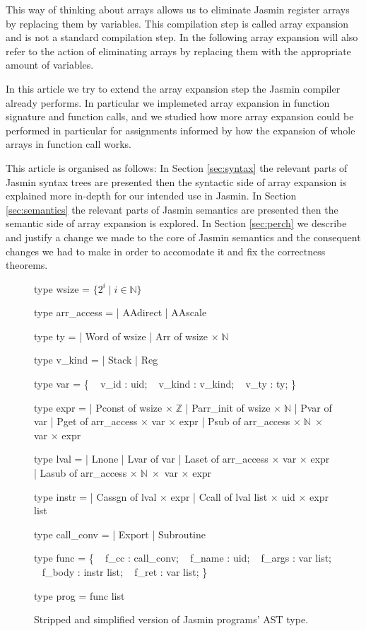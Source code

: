 \documentclass{article}
\newcommand\setZ{\mathbb{Z}}
\newcommand\setN{\mathbb{N}}
\begin{document}
This way of thinking about arrays allows us to eliminate Jasmin register arrays
by replacing them by variables. This compilation step is called array expansion
and is not a standard compilation step. In the following array expansion will
also refer to the action of eliminating arrays by replacing them with the
appropriate amount of variables.

\medskip

In this article we try to extend the array expansion step the Jasmin compiler
already performs. In particular we implemeted array expansion in function
signature and function calls, and we studied how more array expansion could be
performed in particular for assignments informed by how the expansion of whole
arrays in function call works.


\medskip

This article is organised as follows:
In Section \ref{sec:syntax} the relevant parts of Jasmin syntax trees are
presented then the syntactic side of array expansion is explained more in-depth
for our intended use in Jasmin.
In Section \ref{sec:semantics} the relevant parts of Jasmin semantics are
presented then the semantic side of array expansion is explored.
In Section \ref{sec:perch} we describe and justify a change we made to the core
of Jasmin semantics and the consequent changes we had to make in order to
accomodate it and fix the correctness theorems.

\begin{figure}[!b]
\obeylines\obeyspaces\ttfamily%
type wsize = \(\{ 2^i \mid i \in \setN \}\)

type arr\_access =
| AAdirect
| AAscale

type ty =
| Word of wsize
| Arr  of wsize \(\times\;\setN\)

type v\_kind =
| Stack
| Reg

type var = \{
~ v\_id   : uid;
~ v\_kind : v\_kind;
~ v\_ty   : ty;
\}

type expr =
| Pconst    of wsize \(\times\;\setZ\)
| Parr\_init of wsize \(\times\;\setN\)
| Pvar      of var
| Pget      of arr\_access \(\times\) var \(\times\) expr
| Psub      of arr\_access \(\times\;\setN\;\times\) var \(\times\) expr

type lval =
| Lnone
| Lvar  of var
| Laset of arr\_access \(\times\) var \(\times\) expr
| Lasub of arr\_access \(\times\;\setN\;\times\) var \(\times\) expr

type instr =
| Cassgn of lval \(\times\) expr
| Ccall  of lval list \(\times\) uid \(\times\) expr list

type call\_conv =
| Export
| Subroutine

type func = \{
~ f\_cc   : call\_conv;
~ f\_name : uid;
~ f\_args : var list;
~ f\_body : instr list;
~ f\_ret  : var list;
\}

type prog = func list
\normalfont%
\caption{Stripped and simplified version of Jasmin programs' AST type.}\label{fig:types}
\end{figure}
\end{document}
